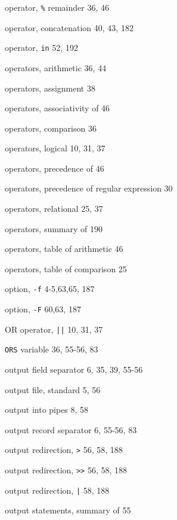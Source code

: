 \begin{multicols}{3}
\hangindent=4pc  operator, \verb'%' remainder 36, 46

\hangindent=4pc  operator, concatenation 40, 43,  182

\hangindent=4pc  operator, \verb'in' 52, 192

\hangindent=4pc  operators, arithmetic 36, 44

\hangindent=4pc  operators, assignment 38

\hangindent=4pc  operators, associativity of 46

\hangindent=4pc  operators, comparison 36

\hangindent=4pc  operators, logical 10, 31, 37

\hangindent=4pc  operators, precedence of 46

\hangindent=4pc  operators, precedence of regular expression 30

\hangindent=4pc  operators, relational 25, 37

\hangindent=4pc  operators, summary of 190

\hangindent=4pc  operators, table of arithmetic 46

\hangindent=4pc  operators, table of comparison 25

\hangindent=4pc  option, \verb'-f' 4-5,63,65, 187

\hangindent=4pc  option, \verb'-F' 60,63, 187

\hangindent=4pc  OR operator, \verb'||' 10, 31, 37

\hangindent=4pc  \verb'ORS' variable 36, 55-56, 83

\hangindent=4pc  output field separator 6, 35, 39, 55-56

\hangindent=4pc  output file, standard 5, 56

\hangindent=4pc  output into pipes 8, 58

\hangindent=4pc  output record separator 6, 55-56,  83

\hangindent=4pc  output redirection, \verb'>' 56, 58, 188

\hangindent=4pc  output redirection, \verb'>>' 56, 58, 188

\hangindent=4pc  output redirection, \verb'|' 58, 188

\hangindent=4pc  output statements, summary of 55


\end{multicols}
